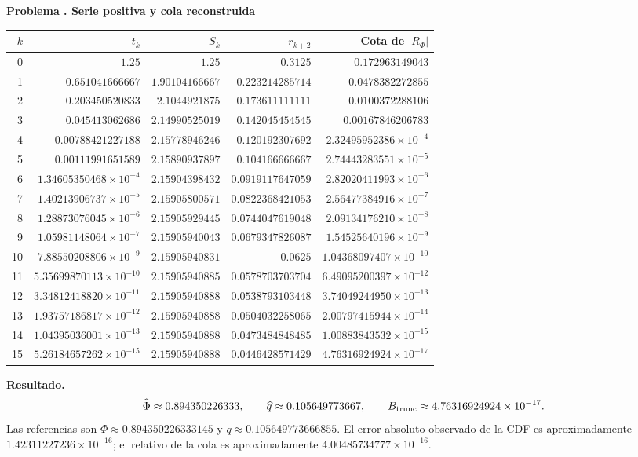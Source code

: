 \documentclass[11pt,a4paper]{article}
\theoremstyle{definition}
\newcounter{problema}
\newenvironment{resuelto}[1]{\refstepcounter{problema}\par\medskip\Needspace{6\baselineskip}\textbf{Problema \theproblema. #1}\par}{\par\medskip}
\begin{document}
\begin{resuelto}{Serie positiva y cola reconstruida}
\begin{center}\small\begin{tabular}{rrrrr}
\toprule
$k$&$t_k$&$S_k$&$r_{k+2}$&Cota de $|R_\Phi|$\\
\midrule
0&$1.25$&$1.25$&$0.3125$&$0.172963149043$\\
1&$0.651041666667$&$1.90104166667$&$0.223214285714$&$0.0478382272855$\\
2&$0.203450520833$&$2.1044921875$&$0.173611111111$&$0.0100372288106$\\
3&$0.045413062686$&$2.14990525019$&$0.142045454545$&$0.00167846206783$\\
4&$0.00788421227188$&$2.15778946246$&$0.120192307692$&$2.32495952386\times10^{-4}$\\
5&$0.00111991651589$&$2.15890937897$&$0.104166666667$&$2.74443283551\times10^{-5}$\\
6&$1.34605350468\times10^{-4}$&$2.15904398432$&$0.0919117647059$&$2.82020411993\times10^{-6}$\\
7&$1.40213906737\times10^{-5}$&$2.15905800571$&$0.0822368421053$&$2.56477384916\times10^{-7}$\\
8&$1.28873076045\times10^{-6}$&$2.15905929445$&$0.0744047619048$&$2.09134176210\times10^{-8}$\\
9&$1.05981148064\times10^{-7}$&$2.15905940043$&$0.0679347826087$&$1.54525640196\times10^{-9}$\\
10&$7.88550208806\times10^{-9}$&$2.15905940831$&$0.0625$&$1.04368097407\times10^{-10}$\\
11&$5.35699870113\times10^{-10}$&$2.15905940885$&$0.0578703703704$&$6.49095200397\times10^{-12}$\\
12&$3.34812418820\times10^{-11}$&$2.15905940888$&$0.0538793103448$&$3.74049244950\times10^{-13}$\\
13&$1.93757186817\times10^{-12}$&$2.15905940888$&$0.0504032258065$&$2.00797415944\times10^{-14}$\\
14&$1.04395036001\times10^{-13}$&$2.15905940888$&$0.0473484848485$&$1.00883843532\times10^{-15}$\\
15&$5.26184657262\times10^{-15}$&$2.15905940888$&$0.0446428571429$&$4.76316924924\times10^{-17}$\\
\bottomrule\end{tabular}\end{center}
\textbf{Resultado.}
\[
\widehat\Phi\approx0.894350226333,\qquad \widehat q\approx0.105649773667,\qquad B_{\rm trunc}\approx4.76316924924\times10^{-17}.
\]
Las referencias son $\Phi\approx0.894350226333145$ y $q\approx0.105649773666855$. El error absoluto observado de la CDF es aproximadamente $1.42311227236\times10^{-16}$; el relativo de la cola es aproximadamente $4.00485734777\times10^{-16}$.

\end{resuelto}
\end{document}
